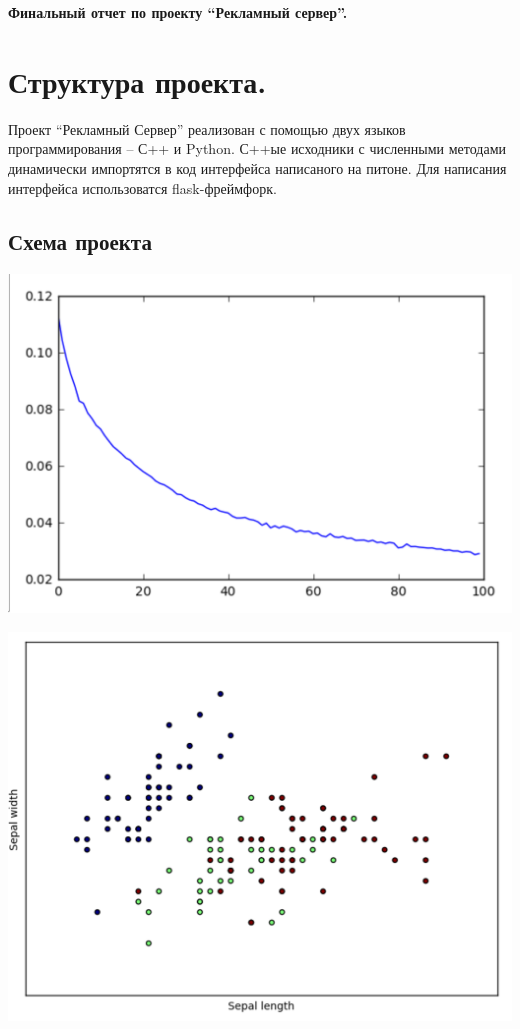 \documentclass{article}
\theoremstyle{definition}
\theoremstyle{remark}
\begin{document}
\begin{center}
\Large{\bf Финальный отчет по проекту ``Рекламный сервер''.}
\end{center}

\tableofcontents

\newpage

\section{Структура проекта.}

Проект ``Рекламный Сервер'' реализован с помощью двух языков программирования -- С++ и Python. С++ые исходники с численными методами динамически импортятся в код интерфейса написаного на питоне. Для написания интерфейса использоватся flask-фреймфорк.


\subsection{Схема проекта}



\includegraphics[width=1 \textwidth]{1.png}

\includegraphics[width=1 \textwidth]{2.png}
\end{document}
